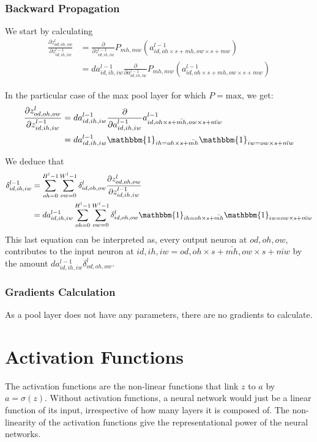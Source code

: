\documentclass{article} %
\begin{document}
\subsubsection{Backward Propagation}
We start by calculating
$$
\begin{aligned}
\frac{\partial z^l_{od, oh, ow}}{\partial z^{l-1}_{id, ih, iw}} 
&= \frac{\partial}{\partial z^{l-1}_{id, ih, iw}} P_{mh, mw}(a^{l-1}_{id, oh\times s+mh, ow\times s+mw})\\
&= da^{l-1}_{id, ih, iw} \frac{\partial}{\partial a^{l-1}_{id, ih, iw}} P_{mh, mw}(a^{l-1}_{id, oh\times s+mh, ow\times s+mw})
\end{aligned}
$$

In the particular case of the max pool layer for which $P=\text{max}$, we get:
$$
\begin{aligned}
\frac{\partial z^l_{od, oh, ow}}{\partial z^{l-1}_{id, ih, iw}} 
&= da^{l-1}_{id, ih, iw} \frac{\partial}{\partial a^{l-1}_{id, ih, iw}} a^{l-1}_{id, oh\times s+\bar{mh}, ow\times s+\bar{mw}} \\
&= da^{l-1}_{id, ih, iw} \mathbbm{1}_{ih=oh\times s + \bar{mh}}\mathbbm{1}_{iw=ow\times s + \bar{mw}} 
\end{aligned}
$$

We deduce that
$$
\begin{aligned}
\delta^{l-1}_{id, ih, iw} 
&= \sum_{oh=0}^{H^l-1}\sum_{ow=0}^{W^l-1} \delta^l_{id, oh, ow}  \frac{\partial z^l_{od, oh, ow}}{\partial z^{l-1}_{id, ih, iw}}  \\
&= da^{l-1}_{id, ih, iw}\sum_{oh=0}^{H^l-1}\sum_{ow=0}^{W^l-1}  \delta^l_{id, oh, ow}  \mathbbm{1}_{ih=oh\times s + \bar{mh}}\mathbbm{1}_{iw=ow\times s + \bar{mw}} 
\end{aligned}
$$
This last equation can be interpreted as, every output neuron at $od, oh, ow$, contributes to the input neuron at $id, ih, iw = od, oh\times s + \bar{mh}, ow\times s + \bar{mw}$ by the amount $da^{l-1}_{id, ih, iw} \delta^l_{od, oh, ow}$.

\subsubsection{Gradients Calculation}
As a pool layer does not have any parameters, there are no gradients to calculate.

\newpage
\section{Activation Functions}
The activation functions are the non-linear functions that link $z$ to $a$ by $a = \sigma(z)$. Without activation functions, a neural network would just be a linear function of its input, irrespective of how many layers it is composed of. The non-linearity of the activation functions give the representational power of the neural networks.
\end{document}
